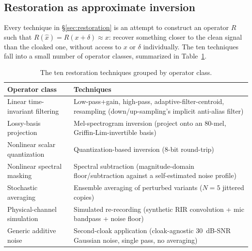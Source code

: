 \documentclass[11pt]{article}
\begin{document}
\subsection{Restoration as approximate inversion}
\label{sec:framework-restoration}
Every technique in \S\ref{sec:restoration} is an attempt to construct
an operator $R$ such that $R(\hat{x}) = R(x+\delta) \approx x$: recover
something closer to the clean signal than the cloaked one, without
access to $x$ or $\delta$ individually. The ten techniques fall into a
small number of operator classes, summarized in
Table~\ref{tab:framework-restoration-classes}.

\begin{table}[H]
\centering
\caption{The ten restoration techniques grouped by operator class.}
\label{tab:framework-restoration-classes}
\begin{tabular}{p{3.6cm}p{8.4cm}}
\toprule
Operator class & Techniques \\
\midrule
Linear time-invariant filtering & Low-pass+gain, high-pass,
  adaptive-filter-centroid, resampling (down/up-sampling's implicit
  anti-alias filter) \\
Lossy-basis projection & Mel-spectrogram inversion (project onto an
  80-mel, Griffin-Lim-invertible basis) \\
Nonlinear scalar quantization & Quantization-based inversion (8-bit
  round-trip) \\
Nonlinear spectral masking & Spectral subtraction (magnitude-domain
  floor/subtraction against a self-estimated noise profile) \\
Stochastic averaging & Ensemble averaging of perturbed variants
  ($N=5$ jittered copies) \\
Physical-channel simulation & Simulated re-recording (synthetic RIR
  convolution + mic bandpass + noise floor) \\
Generic additive noise & Second-cloak application (cloak-agnostic
  30~dB-SNR Gaussian noise, single pass, no averaging) \\
\bottomrule
\end{tabular}
\end{table}
\end{document}
